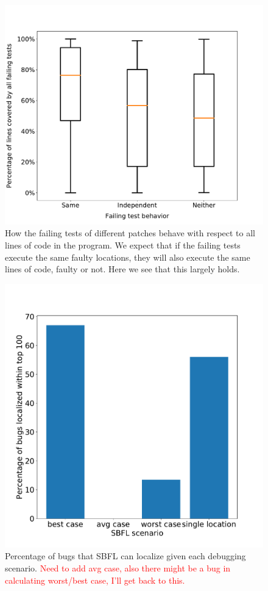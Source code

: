 \documentclass[10pt,journal,compsoc]{IEEEtran}
\newcommand\todo[1]{\textcolor{red}{#1}}
\begin{document}
\begin{figure}
  \includegraphics[width=\linewidth]{img/coverage-all.pdf}
  \caption{\small How the failing tests of different patches behave with respect to all lines of code in the program. We expect that if the failing tests execute the same faulty locations, they will also execute the same lines of code, faulty or not. Here we see that this largely holds.}
  \label{fig:coverage-all}
\end{figure}

\begin{figure}
  \includegraphics[width=\linewidth]{img/debugging_scenarios.pdf}
  \caption{\small Percentage of bugs that SBFL can localize given each debugging scenario. \todo{Need to add avg case, also there might be a bug in calculating worst/best case, I'll get back to this.}}
  \label{fig:debug_scenarios}
\end{figure}
\end{document}
